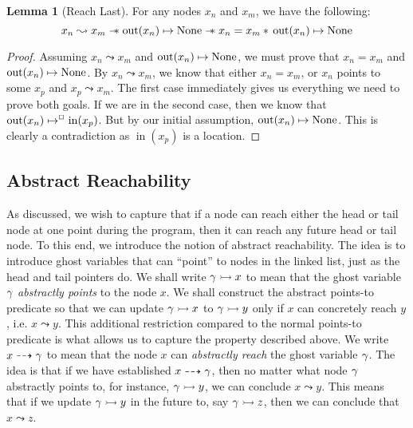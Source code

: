 \documentclass[a4paper, 10pt]{report}
\theoremstyle{definition}
\newtheorem{lemma}[theorem]{Lemma}
\newcommand{\nIn}[1]{\operatorname{in}(#1)}
\newcommand{\nOut}[1]{\operatorname{out}(#1)}
\newcommand{\node}{x}
\newcommand{\nodeM}[1]{\node_{#1}}
\newcommand{\reach}[2]{#1 \leadsto #2}
\newcommand{\ar}[2]{#1 \dashrightarrow #2}
\newcommand{\ap}[2]{#1 \rightarrowtail #2}
\begin{document}
\begin{lemma}[Reach Last]\label{lemma:reach-last}
  For any nodes $\nodeM{n}$ and $\nodeM{m}$, we have the following:
  \begin{equation*}
    \reach{\nodeM{n}}{\nodeM{m}} \wand \nOut{\nodeM{n}} \mapsto \None \wand \nodeM{n} = \nodeM{m} \star{} \nOut{\nodeM{n}} \mapsto \None
  \end{equation*}
\end{lemma}
\begin{proof}
  Assuming $\reach{\nodeM{n}}{\nodeM{m}}$ and $\nOut{\nodeM{n}} \mapsto \None$, we must prove that $\nodeM{n} = \nodeM{m}$ and $\nOut{\nodeM{n}} \mapsto \None$.
  By $\reach{\nodeM{n}}{\nodeM{m}}$, we know that either $\nodeM{n} = \nodeM{m}$, or $\nodeM{n}$ points to some $\nodeM{p}$ and $\reach{\nodeM{p}}{\nodeM{m}}$. The first case immediately gives us everything we need to prove both goals. If we are in the second case, then we know that $\nOut{\nodeM{n}} \mapsto^{\persistently} \nIn{\nodeM{p}}$. But by our initial assumption, $\nOut{\nodeM{n}} \mapsto \None$. This is clearly a contradiction as $\nIn{\nodeM{p}}$ is a location.
\end{proof}

\subsection{Abstract Reachability}
\label{LFMSQSPECS:reachability:sub:abstract}

As discussed, we wish to capture that if a node can reach either the head or tail node at one point during the program, then it can reach any future head or tail node. To this end, we introduce the notion of abstract reachability. The idea is to introduce ghost variables that can ``point'' to nodes in the linked list, just as the head and tail pointers do. We shall write $\ap{\gname}{x}$ to mean that the ghost variable $\gamma$ \emph{abstractly points} to the node $x$. We shall construct the abstract points-to predicate so that we can update $\ap{\gname}{x}$ to $\ap{\gname}{y}$ only if $x$ can concretely reach $y$, i.e. $\reach{x}{y}$. This additional restriction compared to the normal points-to predicate is what allows us to capture the property described above. We write $\ar{x}{\gname}$ to mean that the node $x$ can \emph{abstractly reach} the ghost variable $\gamma$. The idea is that if we have established $\ar{x}{\gname}$, then no matter what node $\gamma$ abstractly points to, for instance, $\ap{\gname}{y}$, we can conclude $\reach{x}{y}$. This means that if we update $\ap{\gname}{y}$ in the future to, say $\ap{\gname}{z}$, then we can conclude that $\reach{x}{z}$.
\end{document}
